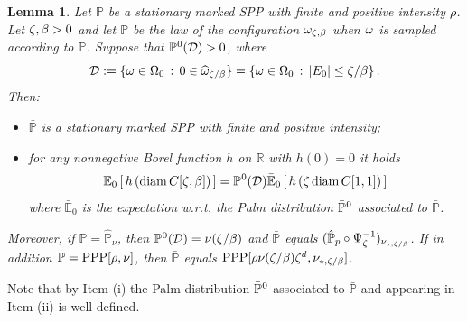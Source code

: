 \documentclass[12pt,a4paper,reqno]{amsart}
\newtheorem{Lemma}[Theorem]{Lemma}
\newcommand{\cD}{\ensuremath{\mathcal D}}
\newcommand{\bbE}{{\ensuremath{\mathbb E}} }
\newcommand{\bbP}{{\ensuremath{\mathbb P}} }
\newcommand{\bbR}{{\ensuremath{\mathbb R}} }
\let\O=\Omega \let\P=\Pi   \let\Ps=\Psi \let\Si=\Sigma \let\X=\Xi
\newcommand{\vvv}{\textcolor{black}} %
\newcommand{\orc}{\textcolor{black}} %
\newcommand{\be}{\begin{equation}}
\newcommand{\en}{\end{equation}}
\newcommand{\vpz}{\vvv{\bbP^{\hspace{0.013cm}0} }}
\newcommand{\bvpz}{\vvv{{\bar\bbP}^{\hspace{0.013cm}0} }}
\begin{document}
 \begin{Lemma}\label{serafico} Let $\bbP$  be a stationary marked SPP with finite and positive intensity \orc{$\rho$}.  Let  $\zeta,\beta>0$ and let  $\bar \bbP$ be the law of the configuration  $\omega_{\zeta,\beta}$   when $\omega$ is sampled according to $\bbP$. 
Suppose that $\vpz(\cD)>0$, where
\[ \cD:=\{\o\in \O_0\,:\,  0
 \in \widehat{\o}_{\z/\b} \}=\{\o\in \O_0\,:\,   |E_0|\leq \z/\b\}  \,.
 \] Then:
\begin{itemize}
\item[(i)]  $\bar\bbP$ is a stationary marked  SPP with finite and positive  intensity; 
\item[(ii)] for any  nonnegative Borel function $h$ on $\bbR$  with $h(0)=0$ it holds 
 \be\label{zoomo}
\bbE_0 \left[ \, h \left({\rm diam}\, C[ \z, \b]  \right) \,\right]=  \vpz (\cD)    \bar \bbE_0 \left[ \, h \left(\z\, {\rm diam}\,C[ 1, 1] \right)\, \right] 
  \en
  where $\bar\bbE_0$ is  the expectation w.r.t. the  Palm distribution  $\bvpz$ associated to $\bar \bbP$.
  \end{itemize}
  
  Moreover, if $\bbP=\hat\bbP_\nu$,  then $\vpz(\cD)=\nu( \z/\b)$ and $\bar \bbP$ equals 
   $(\hat \bbP_p\circ \Psi_{\z}^{-1})_{\nu_{\star,  \z/\b}}$. If in addition $\bbP={\rm PPP}[\rho,\nu]$, then $\bar \bbP$ equals $ {\rm PPP}[\rho \nu(\zeta/\beta)\zeta^d   ,\nu_{\star,  \zeta/\beta}] $.
   
      \end{Lemma}
 Note that by Item (i) the Palm distribution $\bvpz$ associated to $\bar\bbP$ and appearing in Item (ii)  is well defined.
\end{document}
